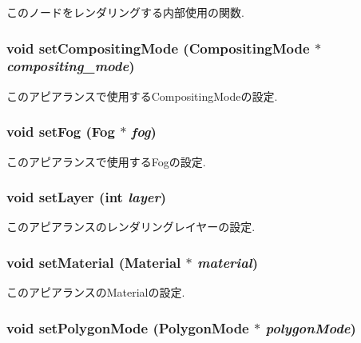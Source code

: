 このノードをレンダリングする内部使用の関数. \hypertarget{classm3g_1_1Appearance_8f9514f1c01268fff95b7c31f3a194b6}{
\subsubsection[{setCompositingMode}]{\setlength{\rightskip}{0pt plus 5cm}void setCompositingMode ({\bf CompositingMode} $\ast$ {\em compositing\_\-mode})}}
\label{classm3g_1_1Appearance_8f9514f1c01268fff95b7c31f3a194b6}


このアピアランスで使用するCompositingModeの設定. \hypertarget{classm3g_1_1Appearance_bc1a612006d6b4c3d443ff6ab542c788}{
\subsubsection[{setFog}]{\setlength{\rightskip}{0pt plus 5cm}void setFog ({\bf Fog} $\ast$ {\em fog})}}
\label{classm3g_1_1Appearance_bc1a612006d6b4c3d443ff6ab542c788}


このアピアランスで使用するFogの設定. \hypertarget{classm3g_1_1Appearance_fbd2fbd594c8ee140b028f505631f682}{
\subsubsection[{setLayer}]{\setlength{\rightskip}{0pt plus 5cm}void setLayer (int {\em layer})}}
\label{classm3g_1_1Appearance_fbd2fbd594c8ee140b028f505631f682}


このアピアランスのレンダリングレイヤーの設定. \hypertarget{classm3g_1_1Appearance_1dfd1a55fa3cc625719dab8e95c8a2de}{
\subsubsection[{setMaterial}]{\setlength{\rightskip}{0pt plus 5cm}void setMaterial ({\bf Material} $\ast$ {\em material})}}
\label{classm3g_1_1Appearance_1dfd1a55fa3cc625719dab8e95c8a2de}


このアピアランスのMaterialの設定. \hypertarget{classm3g_1_1Appearance_cc21fac7868e2ad37e689ac642db1aae}{
\subsubsection[{setPolygonMode}]{\setlength{\rightskip}{0pt plus 5cm}void setPolygonMode ({\bf PolygonMode} $\ast$ {\em polygonMode})}}
\label{classm3g_1_1Appearance_cc21fac7868e2ad37e689ac642db1aae}


